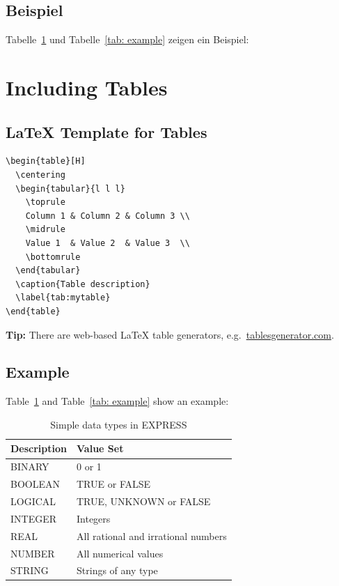   \subsection{Beispiel}
  Tabelle~\ref{tab:express-types} und Tabelle~\ref{tab: example} zeigen ein Beispiel:

\else
  \section{Including Tables}

  \subsection{LaTeX Template for Tables}
  \begin{verbatim}
\begin{table}[H]
  \centering
  \begin{tabular}{l l l}
    \toprule
    Column 1 & Column 2 & Column 3 \\
    \midrule
    Value 1  & Value 2  & Value 3  \\
    \bottomrule
  \end{tabular}
  \caption{Table description}
  \label{tab:mytable}
\end{table}
  \end{verbatim}
  \textbf{Tip:} There are web-based \LaTeX{} table generators, e.g.\ \href{https://www.tablesgenerator.com/}{tablesgenerator.com}.

  \subsection{Example}
  Table~\ref{tab:express-types} and Table~\ref{tab: example} show an example:
\fi

\begin{table}[H]
  \centering
  \begin{tabular}{l l}
    \toprule
    \textbf{Description} & \textbf{Value Set} \\
    \midrule
    BINARY   & 0 or 1 \\
    BOOLEAN  & TRUE or FALSE \\
    LOGICAL  & TRUE, UNKNOWN or FALSE \\
    INTEGER  & Integers \\
    REAL     & All rational and irrational numbers \\
    NUMBER   & All numerical values \\
    STRING   & Strings of any type \\
    \bottomrule
  \end{tabular}
  \caption{Simple data types in EXPRESS}
  \label{tab:express-types}
\end{table}

